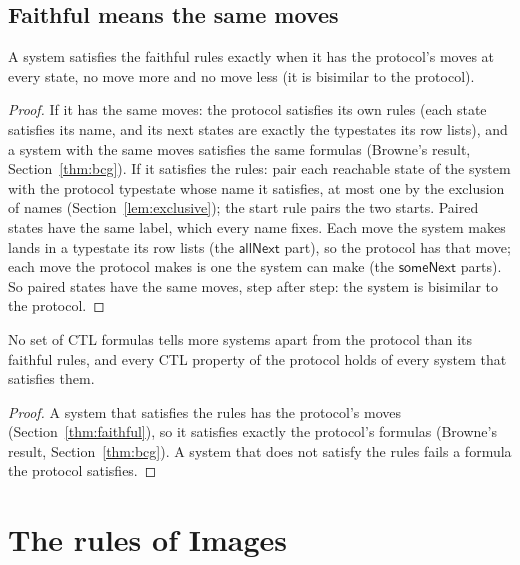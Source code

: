 \begin{theorem}[Faithfulness]\label{thm:faithful}
\subsection{Faithful means the same moves}

A system satisfies the faithful rules exactly when it has the protocol's moves at every
state, no move more and no move less (it is bisimilar to the protocol).
\end{theorem}

\begin{proof}
If it has the same moves: the protocol satisfies its own rules (each state satisfies its
name, and its next states are exactly the typestates its row lists), and a system with the
same moves satisfies the same formulas (Browne's result, Section~\ref{thm:bcg}).
If it satisfies the rules: pair each reachable state of the system with the protocol
typestate whose name it satisfies, at most one by the exclusion of names (Section~\ref{lem:exclusive}); the start rule
pairs the two starts. Paired states have the same label, which every name fixes. Each move
the system makes lands in a typestate its row lists (the $\mathsf{allNext}$ part), so the
protocol has that move; each move the protocol makes is one the system can make (the
$\mathsf{someNext}$ parts). So paired states have the same moves, step after step: the
system is bisimilar to the protocol.
\end{proof}

\begin{corollary}\label{cor:best}
No set of CTL formulas tells more systems apart from the protocol than its faithful rules,
and every CTL property of the protocol holds of every system that satisfies them.
\end{corollary}

\begin{proof}
A system that satisfies the rules has the protocol's moves (Section~\ref{thm:faithful}), so
it satisfies exactly the protocol's formulas (Browne's result, Section~\ref{thm:bcg}). A system that does not
satisfy the rules fails a formula the protocol satisfies.
\end{proof}

\section{The rules of Images}

